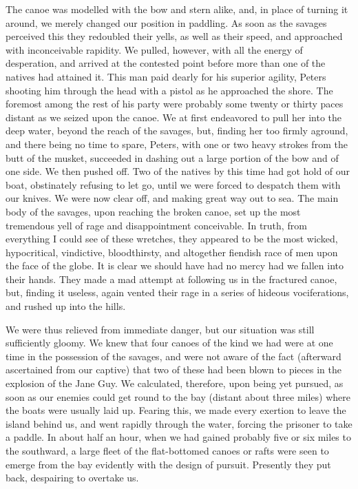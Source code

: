 The canoe was modelled with the bow and stern alike, and, in place of turning
it around, we merely changed our position in paddling. As soon as the savages
perceived this they redoubled their yells, as well as their speed, and
approached with inconceivable rapidity. We pulled, however, with all the energy
of desperation, and arrived at the contested point before more than one of the
natives had attained it. This man paid dearly for his superior agility, Peters
shooting him through the head with a pistol as he approached the shore. The
foremost among the rest of his party were probably some twenty or thirty paces
distant as we seized upon the canoe. We at first endeavored to pull her into the
deep water, beyond the reach of the savages, but, finding her too firmly
aground, and there being no time to spare, Peters, with one or two heavy strokes
from the butt of the musket, succeeded in dashing out a large portion of the bow
and of one side. We then pushed off. Two of the natives by this time had got
hold of our boat, obstinately refusing to let go, until we were forced to
despatch them with our knives. We were now clear off, and making great way out
to sea. The main body of the savages, upon reaching the broken canoe, set up the
most tremendous yell of rage and disappointment conceivable. In truth, from
everything I could see of these wretches, they appeared to be the most wicked,
hypocritical, vindictive, bloodthirsty, and altogether fiendish race of men upon
the face of the globe. It is clear we should have had no mercy had we fallen
into their hands. They made a mad attempt at following us in the fractured
canoe, but, finding it useless, again vented their rage in a series of hideous
vociferations, and rushed up into the hills. 

We were thus relieved from immediate danger, but our situation was still
sufficiently gloomy. We knew that four canoes of the kind we had were at one
time in the possession of the savages, and were not aware of the fact (afterward
ascertained from our captive) that two of these had been blown to pieces in the
explosion of the Jane Guy. We calculated, therefore, upon being yet pursued, as
soon as our enemies could get round to the bay (distant about three miles) where
the boats were usually laid up. Fearing this, we made every exertion to leave
the island behind us, and went rapidly through the water, forcing the prisoner
to take a paddle. In about half an hour, when we had gained probably five or six
miles to the southward, a large fleet of the flat-bottomed canoes or rafts were
seen to emerge from the bay evidently with the design of pursuit. Presently they
put back, despairing to overtake us. 


